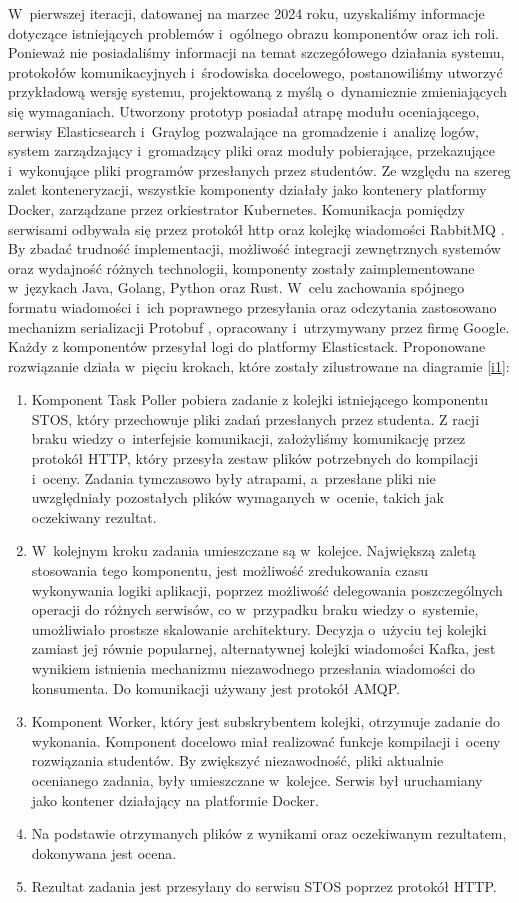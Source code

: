 W~pierwszej iteracji, datowanej na marzec 2024 roku, uzyskaliśmy informacje dotyczące istniejących problemów i~ogólnego obrazu komponentów oraz ich roli. Ponieważ nie posiadaliśmy informacji na temat szczegółowego działania systemu, protokołów komunikacyjnych i~środowiska docelowego, postanowiliśmy utworzyć przykładową wersję systemu, projektowaną z myślą o~dynamicznie zmieniających się wymaganiach. Utworzony prototyp posiadał atrapę modułu oceniającego, serwisy Elasticsearch i~Graylog pozwalające na gromadzenie i~analizę logów, system zarządzający i~gromadzący pliki oraz moduły pobierające, przekazujące i~wykonujące pliki programów przesłanych przez studentów. Ze względu na szereg zalet konteneryzacji, wszystkie komponenty działały jako kontenery platformy Docker, zarządzane przez orkiestrator Kubernetes. Komunikacja pomiędzy serwisami odbywała się przez protokół http oraz kolejkę wiadomości RabbitMQ \cite{rabbit}. By zbadać trudność implementacji, możliwość integracji zewnętrznych systemów oraz wydajność różnych technologii, komponenty zostały zaimplementowane w~językach Java, Golang, Python oraz Rust. W~celu zachowania spójnego formatu wiadomości i~ich poprawnego przesyłania oraz odczytania zastosowano mechanizm serializacji Protobuf \cite{protobuf}, opracowany i~utrzymywany przez firmę Google. Każdy z komponentów przesyłał logi do platformy Elasticstack. Proponowane rozwiązanie działa w~pięciu krokach, które zostały zilustrowane na diagramie \ref{i1}:
\begin{enumerate}
	\item Komponent Task Poller pobiera zadanie z kolejki istniejącego komponentu STOS, który przechowuje pliki zadań przesłanych przez studenta. Z racji braku wiedzy o~interfejsie komunikacji, założyliśmy komunikację przez protokół HTTP, który przesyła zestaw plików potrzebnych do kompilacji i~oceny. Zadania tymczasowo były atrapami, a~przesłane pliki nie uwzględniały pozostałych plików wymaganych w~ocenie, takich jak oczekiwany rezultat.
	\item W~kolejnym kroku zadania umieszczane są w~kolejce. Największą zaletą stosowania tego komponentu, jest możliwość zredukowania czasu wykonywania logiki aplikacji, poprzez możliwość delegowania poszczególnych operacji do różnych serwisów, co w~przypadku braku wiedzy o~systemie, umożliwiało prostsze skalowanie architektury. Decyzja o~użyciu tej kolejki zamiast jej równie popularnej, alternatywnej kolejki wiadomości Kafka, jest wynikiem istnienia mechanizmu niezawodnego przesłania wiadomości do konsumenta. Do komunikacji używany jest protokół AMQP.
	\item Komponent Worker, który jest subskrybentem kolejki, otrzymuje zadanie do wykonania. Komponent docelowo miał realizować funkcje kompilacji i~oceny rozwiązania studentów. By zwiększyć niezawodność, pliki aktualnie ocenianego zadania, były umieszczane w~kolejce. Serwis był uruchamiany jako kontener działający na platformie Docker.
	\item Na podstawie otrzymanych plików z wynikami oraz oczekiwanym rezultatem, dokonywana jest ocena.
	\item Rezultat zadania jest przesyłany do serwisu STOS poprzez protokół HTTP.
\end{enumerate}
